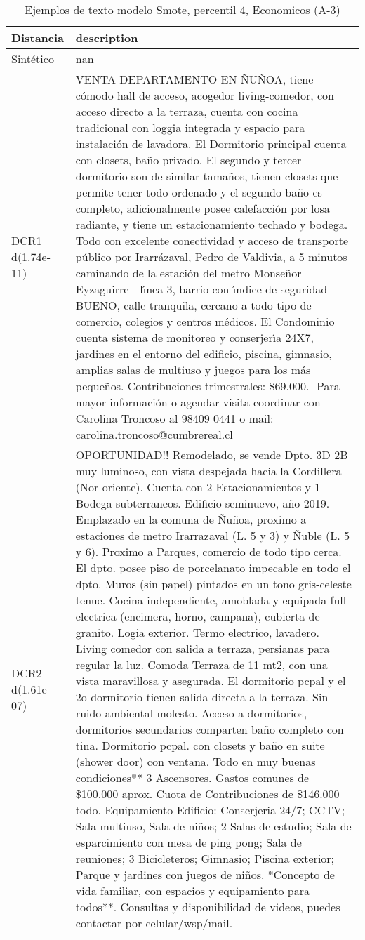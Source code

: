 \begin{table}[H]
\centering
\fontsize{10}{14}\selectfont
\caption{Ejemplos de texto modelo Smote, percentil 4, Economicos (A-3)}
\label{table-example-economicos-a-3-smote-enc-4p-text}
\begin{tabular}{|l|m{35em}|}
\hline
\rowcolor[gray]{0.8}
Distancia & description \\
\hline Sintético & nan \\
\hline DCR1 d(1.74e-11) & VENTA DEPARTAMENTO EN \~NU\~NOA, tiene c\'omodo hall de acceso, acogedor living-comedor, con acceso directo a la terraza, cuenta con cocina tradicional con loggia integrada y espacio para instalaci\'on de lavadora. El Dormitorio principal cuenta con closets, ba\~no privado. El segundo y tercer dormitorio son de similar tama\~nos, tienen closets que permite tener todo ordenado y el segundo ba\~no es completo, adicionalmente posee calefacci\'on por losa radiante, y tiene un estacionamiento techado y bodega. Todo con excelente conectividad y acceso de transporte p\'ublico por Irarr\'azaval, Pedro de Valdivia, a 5 minutos caminando de la estaci\'on del metro Monse\~nor Eyzaguirre - l{\'\i}nea 3, barrio con {\'\i}ndice de seguridad-BUENO, calle tranquila, cercano a todo tipo de comercio, colegios y centros m\'edicos. El Condominio cuenta sistema de monitoreo y conserjer{\'\i}a 24X7, jardines en el entorno del edificio, piscina, gimnasio, amplias salas de multiuso y juegos para los m\'as peque\~nos. Contribuciones trimestrales: \$69.000.-  Para mayor informaci\'on o agendar visita coordinar con Carolina Troncoso al 98409 0441 o mail: carolina.troncoso@cumbrereal.cl \\
\hline DCR2 d(1.61e-07) & OPORTUNIDAD!! Remodelado, se vende Dpto. 3D 2B muy luminoso, con vista despejada hacia la Cordillera (Nor-oriente). Cuenta con 2 Estacionamientos y 1 Bodega subterraneos. Edificio seminuevo, a\~no 2019. Emplazado en la comuna de \~Nu\~noa, proximo a estaciones de metro Irarrazaval (L. 5 y 3) y \~Nuble (L. 5 y 6). Proximo a Parques, comercio de todo tipo cerca.  El dpto. posee piso de porcelanato impecable en todo el dpto. Muros (sin papel) pintados en un tono gris-celeste tenue. Cocina independiente, amoblada y equipada full electrica (encimera, horno, campana), cubierta de granito. Logia exterior. Termo electrico, lavadero. Living comedor con salida a terraza, persianas para regular la luz. Comoda Terraza de 11 mt2, con una vista maravillosa y asegurada. El dormitorio pcpal y el 2o dormitorio tienen salida directa a la terraza. Sin ruido ambiental molesto. Acceso a dormitorios, dormitorios secundarios comparten ba\~no completo con tina.  Dormitorio pcpal. con closets y ba\~no en suite (shower door) con ventana. Todo en muy buenas condiciones** 3 Ascensores. Gastos comunes de \$100.000 aprox. Cuota de Contribuciones de \$146.000 todo. Equipamiento Edificio: Conserjeria 24/7; CCTV; Sala multiuso, Sala de ni\~nos; 2 Salas de estudio; Sala de esparcimiento con mesa de ping pong; Sala de reuniones; 3 Bicicleteros; Gimnasio; Piscina exterior; Parque y jardines con juegos de ni\~nos. *Concepto de vida familiar, con espacios y equipamiento para todos**. Consultas y disponibilidad de videos, puedes contactar por celular/wsp/mail. \\

\end{tabular}
\end{table}
